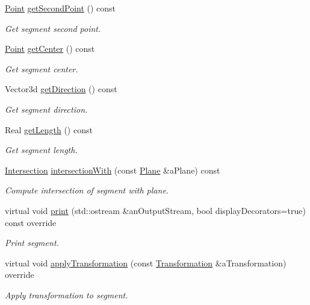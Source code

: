 \begin{DoxyCompactItemize}
\hyperlink{classostk_1_1math_1_1geom_1_1d3_1_1objects_1_1_point}{Point} \hyperlink{classostk_1_1math_1_1geom_1_1d3_1_1objects_1_1_segment_a194f50a9505400681ba0bb15ae999465}{get\+Second\+Point} () const
\begin{DoxyCompactList}\small\item\em Get segment second point. \end{DoxyCompactList}\item 
\hyperlink{classostk_1_1math_1_1geom_1_1d3_1_1objects_1_1_point}{Point} \hyperlink{classostk_1_1math_1_1geom_1_1d3_1_1objects_1_1_segment_a7d37a80e12053ec307dfd8e4d3973843}{get\+Center} () const
\begin{DoxyCompactList}\small\item\em Get segment center. \end{DoxyCompactList}\item 
Vector3d \hyperlink{classostk_1_1math_1_1geom_1_1d3_1_1objects_1_1_segment_ab708b9d0ab53ef8b15974244810a732f}{get\+Direction} () const
\begin{DoxyCompactList}\small\item\em Get segment direction. \end{DoxyCompactList}\item 
Real \hyperlink{classostk_1_1math_1_1geom_1_1d3_1_1objects_1_1_segment_a0f40747b4f8da2ef00b57ff0e4445968}{get\+Length} () const
\begin{DoxyCompactList}\small\item\em Get segment length. \end{DoxyCompactList}\item 
\hyperlink{classostk_1_1math_1_1geom_1_1d3_1_1_intersection}{Intersection} \hyperlink{classostk_1_1math_1_1geom_1_1d3_1_1objects_1_1_segment_a0a2acca7fc6eb6d957a33381ab8bc6b1}{intersection\+With} (const \hyperlink{classostk_1_1math_1_1geom_1_1d3_1_1objects_1_1_plane}{Plane} \&a\+Plane) const
\begin{DoxyCompactList}\small\item\em Compute intersection of segment with plane. \end{DoxyCompactList}\item 
virtual void \hyperlink{classostk_1_1math_1_1geom_1_1d3_1_1objects_1_1_segment_a2c2029b6b84e984532f98dbd9a10ff1b}{print} (std\+::ostream \&an\+Output\+Stream, bool display\+Decorators=true) const override
\begin{DoxyCompactList}\small\item\em Print segment. \end{DoxyCompactList}\item 
virtual void \hyperlink{classostk_1_1math_1_1geom_1_1d3_1_1objects_1_1_segment_a5d2aba754d42c89224c7579944de9c4f}{apply\+Transformation} (const \hyperlink{classostk_1_1math_1_1geom_1_1d3_1_1_transformation}{Transformation} \&a\+Transformation) override
\begin{DoxyCompactList}\small\item\em Apply transformation to segment. \end{DoxyCompactList}\end{DoxyCompactItemize}

